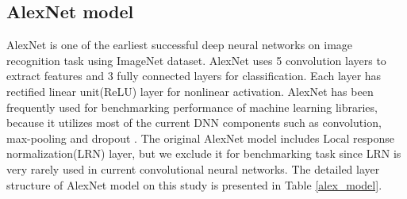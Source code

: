 \subsection{AlexNet model}
AlexNet \cite{krizhevsky2012imagenet} is one of the earliest successful deep neural networks on image recognition task using ImageNet dataset.
AlexNet uses 5 convolution layers to extract features and 3 fully connected layers for classification.
Each layer has rectified linear unit(ReLU) layer for nonlinear activation.
AlexNet has been frequently used for benchmarking performance of machine learning libraries, because it utilizes most of the current DNN components such as convolution, max-pooling and dropout \cite{convnet-benchmarks}.
The original AlexNet model includes Local response normalization(LRN) layer, but we exclude it for benchmarking task since LRN is very rarely used in current convolutional neural networks.
The detailed layer structure of AlexNet model on this study is presented in Table \ref{alex_model}.


